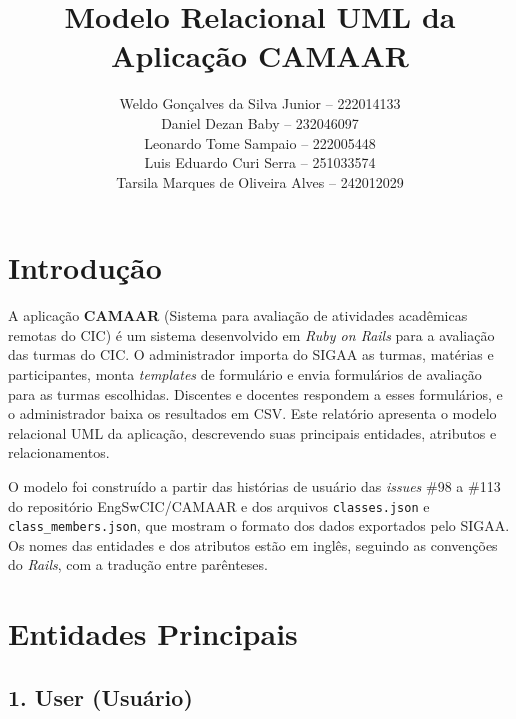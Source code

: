 \documentclass[a4paper,12pt]{article}
\title{Modelo Relacional UML da Aplicação CAMAAR}
\author{Weldo Gonçalves da Silva Junior -- 222014133 \\
Daniel Dezan Baby -- 232046097 \\
Leonardo Tome Sampaio -- 222005448 \\
Luis Eduardo Curi Serra -- 251033574 \\
Tarsila Marques de Oliveira Alves -- 242012029}
\date{}
\begin{document}
\maketitle

\section*{Introdução}

A aplicação \textbf{CAMAAR} (Sistema para avaliação de atividades acadêmicas remotas do CIC) é um sistema desenvolvido em \textit{Ruby on Rails} para a avaliação das turmas do CIC. O administrador importa do SIGAA as turmas, matérias e participantes, monta \textit{templates} de formulário e envia formulários de avaliação para as turmas escolhidas. Discentes e docentes respondem a esses formulários, e o administrador baixa os resultados em CSV. Este relatório apresenta o modelo relacional UML da aplicação, descrevendo suas principais entidades, atributos e relacionamentos.

O modelo foi construído a partir das histórias de usuário das \textit{issues} \#98 a \#113 do repositório EngSwCIC/CAMAAR e dos arquivos \texttt{classes.json} e \texttt{class\_members.json}, que mostram o formato dos dados exportados pelo SIGAA. Os nomes das entidades e dos atributos estão em inglês, seguindo as convenções do \textit{Rails}, com a tradução entre parênteses.

\section*{Entidades Principais}

\subsection*{1. User (Usuário)}
\end{document}
